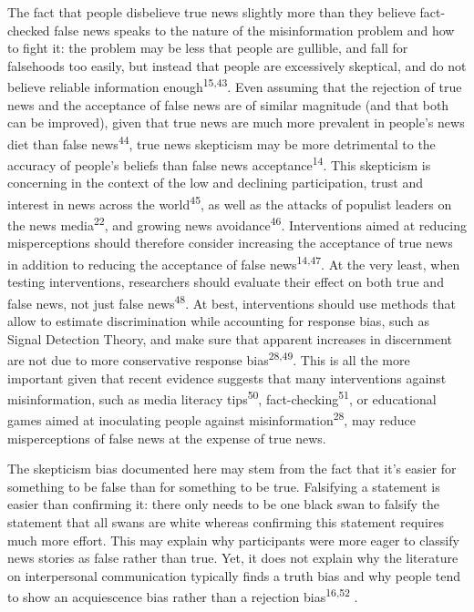 \documentclass[
  man]{apa6}
\begin{document}
The fact that people disbelieve true news slightly more than they believe fact-checked false news speaks to the nature of the misinformation problem and how to fight it: the problem may be less that people are gullible, and fall for falsehoods too easily, but instead that people are excessively skeptical, and do not believe reliable information enough\textsuperscript{15,43}. Even assuming that the rejection of true news and the acceptance of false news are of similar magnitude (and that both can be improved), given that true news are much more prevalent in people's news diet than false news\textsuperscript{44}, true news skepticism may be more detrimental to the accuracy of people's beliefs than false news acceptance\textsuperscript{14}. This skepticism is concerning in the context of the low and declining participation, trust and interest in news across the world\textsuperscript{45}, as well as the attacks of populist leaders on the news media\textsuperscript{22}, and growing news avoidance\textsuperscript{46}. Interventions aimed at reducing misperceptions should therefore consider increasing the acceptance of true news in addition to reducing the acceptance of false news\textsuperscript{14,47}. At the very least, when testing interventions, researchers should evaluate their effect on both true and false news, not just false news\textsuperscript{48}. At best, interventions should use methods that allow to estimate discrimination while accounting for response bias, such as Signal Detection Theory, and make sure that apparent increases in discernment are not due to more conservative response bias\textsuperscript{28,49}. This is all the more important given that recent evidence suggests that many interventions against misinformation, such as media literacy tips\textsuperscript{50}, fact-checking\textsuperscript{51}, or educational games aimed at inoculating people against misinformation\textsuperscript{28}, may reduce misperceptions of false news at the expense of true news.

The skepticism bias documented here may stem from the fact that it's easier for something to be false than for something to be true. Falsifying a statement is easier than confirming it: there only needs to be one black swan to falsify the statement that all swans are white whereas confirming this statement requires much more effort. This may explain why participants were more eager to classify news stories as false rather than true. Yet, it does not explain why the literature on interpersonal communication typically finds a truth bias and why people tend to show an acquiescence bias rather than a rejection bias\textsuperscript{16,52} .
\end{document}
